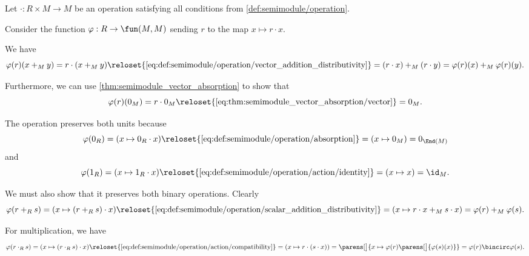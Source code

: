 \begin{defproof}
   Let \( {\cdot}: R \times M \to M \) be an operation satisfying all conditions from \cref{def:semimodule/operation}.

  Consider the function \( \varphi: R \to \fun(M, M) \) sending \( r \) to the map \( x \mapsto r \cdot x \).

   We have
  \begin{equation*}
    \varphi(r)(x +_M y)
    =
    r \cdot (x +_M y)
    \reloset {\eqref{eq:def:semimodule/operation/vector_addition_distributivity}} =
    (r \cdot x) +_M (r \cdot y)
    =
    \varphi(r)(x) +_M \varphi(r)(y).
  \end{equation*}

  Furthermore, we can use \cref{thm:semimodule_vector_absorption} to show that
  \begin{equation*}
    \varphi(r)(0_M)
    =
    r \cdot 0_M
    \reloset {\eqref{eq:thm:semimodule_vector_absorption/vector}} =
    0_M.
  \end{equation*}


  The operation preserves both units because
  \begin{equation*}
    \varphi(0_R)
    =
    (x \mapsto 0_R \cdot x)
    \reloset {\eqref{eq:def:semimodule/operation/absorption}} =
    (x \mapsto 0_M)
    =
    0_{\End(M)}
  \end{equation*}
  and
  \begin{equation*}
    \varphi(1_R)
    =
    (x \mapsto 1_R \cdot x)
    \reloset {\eqref{eq:def:semimodule/operation/action/identity}} =
    (x \mapsto x)
    =
    \id_M.
  \end{equation*}

  We must also show that it preserves both binary operations. Clearly
  \begin{equation*}
    \varphi(r +_R s)
    =
    (x \mapsto (r +_R s) \cdot x)
    \reloset {\eqref{eq:def:semimodule/operation/scalar_addition_distributivity}} =
    (x \mapsto r \cdot x +_M s \cdot x)
    =
    \varphi(r) +_M \varphi(s).
  \end{equation*}

  For multiplication, we have
  \begin{equation*}
    \varphi(r \cdot_R s)
    =
    (x \mapsto (r \cdot_R s) \cdot x)
    \reloset {\eqref{eq:def:semimodule/operation/action/compatibility}} =
    (x \mapsto r \cdot (s \cdot x))
    =
    \parens[\big]{ x \mapsto \varphi(r)\parens[\big]{ \varphi(s)(x) } }
    =
    \varphi(r) \bincirc \varphi(s).
  \end{equation*}
\end{defproof}

